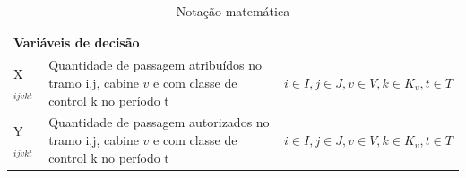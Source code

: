 \begin{table}[h]
\begin{tabular}{p{2cm} p{9.5cm} p{3.2cm}}
		\multicolumn{3}{l}{\textbf{Variáveis de decisão}}                                                                                                                         \\ \midrule
		X$_{ijvkt}$        & Quantidade de passagem atribuídos no tramo i,j, cabine $v$ e com classe de control k no período t  & $i \in I, j \in J, v \in V, k \in K_v, t \in T$ \\
		Y$_{ijvkt}$        & Quantidade de passagem autorizados no tramo i,j, cabine $v$ e com classe de control k no período t & $i \in I, j \in J, v \in V, k \in K_v, t \in T$ \\ \bottomrule
	\end{tabular}
	\caption{Notação matemática}
	\label{Notacao}
\end{table}

